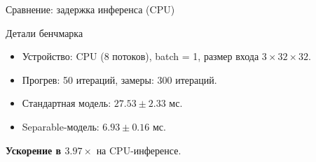 \documentclass[11pt,aspectratio=169]{beamer}
\begin{document}
\begin{frame}{Сравнение: задержка инференса (CPU)}
  \centering

  \begin{block}{Детали бенчмарка}
    \begin{itemize}
      \item Устройство: CPU (8 потоков), batch = 1, размер входа \(3 \times 32 \times 32\).
      \item Прогрев: 50 итераций, замеры: 300 итераций.
      \item Стандартная модель: \(27.53 \pm 2.33\) мс.
      \item Separable-модель: \alert{\(6.93 \pm 0.16\)} мс.
    \end{itemize}
    \textbf{Ускорение в \(\mathbf{3.97\times}\)} на CPU-инференсе.
  \end{block}

\end{frame}
\end{document}
